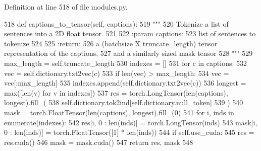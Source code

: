 Definition at line 518 of file modules.\+py.


\begin{DoxyCode}
518     \textcolor{keyword}{def }captions\_to\_tensor(self, captions):
519         \textcolor{stringliteral}{"""}
520 \textcolor{stringliteral}{        Tokenize a list of sentences into a 2D float tensor.}
521 \textcolor{stringliteral}{}
522 \textcolor{stringliteral}{        :param captions:}
523 \textcolor{stringliteral}{            list of sentences to tokenize}
524 \textcolor{stringliteral}{}
525 \textcolor{stringliteral}{        :return:}
526 \textcolor{stringliteral}{            a (batchsize X truncate\_length) tensor representation of the captions,}
527 \textcolor{stringliteral}{            and a similarly sized mask tensor}
528 \textcolor{stringliteral}{        """}
529         max\_length = self.truncate\_length
530         indexes = []
531         \textcolor{keywordflow}{for} c \textcolor{keywordflow}{in} captions:
532             vec = self.dictionary.txt2vec(c)
533             \textcolor{keywordflow}{if} len(vec) > max\_length:
534                 vec = vec[:max\_length]
535             indexes.append(self.dictionary.txt2vec(c))
536         longest = max([len(v) \textcolor{keywordflow}{for} v \textcolor{keywordflow}{in} indexes])
537         res = torch.LongTensor(len(captions), longest).fill\_(
538             self.dictionary.tok2ind[self.dictionary.null\_token]
539         )
540         mask = torch.FloatTensor(len(captions), longest).fill\_(0)
541         \textcolor{keywordflow}{for} i, inds \textcolor{keywordflow}{in} enumerate(indexes):
542             res[i, 0 : len(inds)] = torch.LongTensor(inds)
543             mask[i, 0 : len(inds)] = torch.FloatTensor([1] * len(inds))
544         \textcolor{keywordflow}{if} self.use\_cuda:
545             res = res.cuda()
546             mask = mask.cuda()
547         \textcolor{keywordflow}{return} res, mask
548 
\end{DoxyCode}
\mbox{\label{classprojects_1_1personality__captions_1_1transresnet_1_1modules_1_1TransresnetModel_a9f2a69ead8d29f468ec6c87fbf950b57}} 
